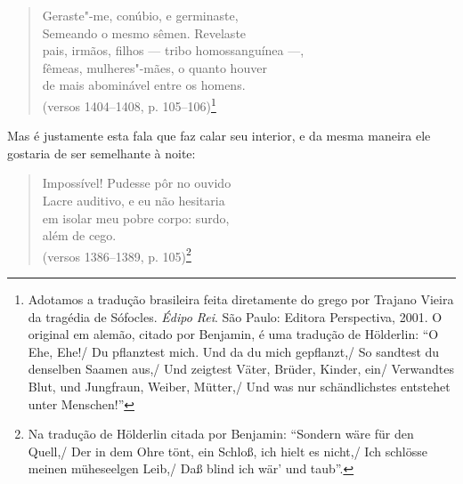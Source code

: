 \begin{verse}
Geraste"-me, conúbio, e germinaste,\\
Semeando o mesmo sêmen. Revelaste\\
pais, irmãos, filhos \qb{}--- tribo homossanguínea ---,\\
fêmeas, mulheres"-mães, o quanto houver\\
de mais abominável entre os homens.\\
(versos 1404--1408, p. 105--106)\footnote{Adotamos a tradução
  brasileira feita diretamente do grego por Trajano Vieira da tragédia
  de Sófocles. \emph{Édipo Rei}. São Paulo: Editora Perspectiva, 2001. O
  original em alemão, citado por Benjamin, é uma tradução de Hölderlin:
  ``O Ehe, Ehe!/ Du pflanztest mich. Und da du mich gepflanzt,/
  So sandtest du denselben Saamen aus,/
  Und zeigtest Väter, Brüder, Kinder, ein/
  Verwandtes Blut, und Jungfraun, Weiber, Mütter,/
  Und was nur schändlichstes entstehet unter Menschen!'' \versal{[N.~T.]}}
\end{verse}

Mas é justamente esta fala que faz calar seu interior, e da mesma maneira ele
gostaria de ser semelhante à noite:

\begin{verse}
Impossível! Pudesse pôr no ouvido\\
Lacre auditivo, e eu não hesitaria\\
em isolar meu pobre corpo: surdo,\\
além de cego.\\
(versos 1386--1389, p. 105)\footnote{Na tradução de Hölderlin
  citada por Benjamin: ``Sondern wäre für den Quell,/ Der in dem Ohre
  tönt, ein Schloß, ich hielt es nicht,/ Ich schlösse meinen müheseelgen
  Leib,/ Daß blind ich wär' und taub''. \versal{[N.~T.]}}
\end{verse}


